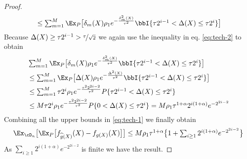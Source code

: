 \begin{proof}
\[\begin{aligned}
        & \le  \textstyle \textstyle\sum _{m = 1}^M\Ex_P\big [ \delta_m(X) \rho_1 e^{- \frac{\delta_m^2(X)}{\tau^2} } \bbI \{ \tau 2^{i -1} < \Delta(X) \le \tau 2^i \}   \big]\\
    \end{aligned}
    \] Because $\Delta(X) \ge \tau 2^{i-1} > \nicefrac\tau{\sqrt{2}}$ we again use the inequality in eq. \eqref{eq:tech-2} to obtain
\[
\begin{aligned}
&   \textstyle \textstyle\sum _{m = 1}^M\Ex_P\big [ \delta_m(X) \rho_1 e^{- \frac{\delta_m^2(X)}{\tau^2} } \bbI \{ \tau 2^{i -1} < \Delta(X) \le \tau 2^i \}   \big]\\
& \le  \textstyle \textstyle\sum _{m = 1}^M\Ex_P\big [ \Delta(X) \rho_1 e^{- \frac{\Delta^2(X)}{\tau^2} } \bbI \{ \tau 2^{i -1} < \Delta(X) \le \tau 2^i \}   \big]\\ 
& \le  \textstyle \textstyle\sum _{m = 1}^M \tau2^i \rho_1 e^{- \frac{\tau^2 2^{2i - 2}}{\tau^2} } P \{ \tau 2^{i -1} < \Delta(X) \le \tau 2^i \}   \\ 
& \le  \textstyle \textstyle M \tau2^i \rho_1 e^{- \frac{\tau^2 2^{2i - 2}}{\tau^2} } P \{ 0 < \Delta(X) \le \tau 2^i \} = M \rho_1 \tau^{1 + \alpha} 2^{i(1+\alpha)} e^{-2^{2i-2}}   \\ 
\end{aligned}
\] Combining all the upper bounds in \eqref{eq:tech-1} we finally obtain
\begin{equation}
    \begin{aligned}
        \Ex_{\cD_n}\big [ \Ex_P\big [ f_{\widehat g(X)}(X) - f_{g(X)}(X)  \big]\big ] \le \textstyle M\rho_1\tau^{1+\alpha} \big \{ 1+ \sum_{i \ge 1}2^{i(1+\alpha)} e^{-2^{2i-2}} \big \} 
    \end{aligned}
\end{equation} As $\sum_{i \ge 1}2^{i(1+\alpha)} e^{-2^{2i-2}}$ is finite we have the result. 
 \end{proof}




